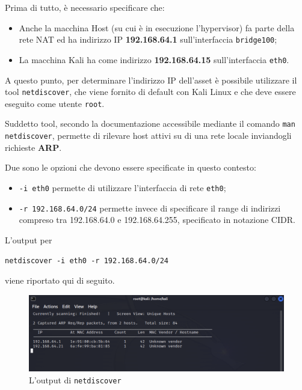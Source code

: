 \documentclass[a4paper, 12pt, oneside]{article}
\begin{document}
Prima di tutto, è necessario specificare che:

\begin{itemize}
    \item Anche la macchina Host (su cui è in esecuzione l'hypervisor) fa parte della rete NAT ed ha indirizzo IP \textbf{192.168.64.1} sull'interfaccia \texttt{bridge100};
    \item La macchina Kali ha come indirizzo \textbf{192.168.64.15} sull'interfaccia \texttt{eth0}.
\end{itemize}

A questo punto, per determinare l'indirizzo IP dell'asset è possibile utilizzare il tool \texttt{netdiscover}, che viene fornito di default con Kali Linux e che deve essere eseguito come utente \texttt{root}.

Suddetto tool, secondo la documentazione accessibile mediante il comando \texttt{man netdiscover}, permette di rilevare host attivi su di una rete locale inviandogli richieste \textbf{ARP}. 

Due sono le opzioni che devono essere specificate in questo contesto:

\begin{itemize}
    \item \texttt{-i eth0} permette di utilizzare l'interfaccia di rete \texttt{eth0};
    \item \texttt{-r 192.168.64.0\slash24} permette invece di specificare il range di indirizzi compreso tra 192.168.64.0 e 192.168.64.255, specificato in notazione CIDR.
\end{itemize}

\newpage
L'output per
\begin{center}
    \texttt{netdiscover -i eth0 -r 192.168.64.0\slash24}
\end{center}

viene riportato qui di seguito.

\begin{figure}[h]
    \centering
    \includegraphics[width=\textwidth]{img/netdiscover.png}
    \caption{L'output di \texttt{netdiscover}}
\end{figure}
\end{document}
